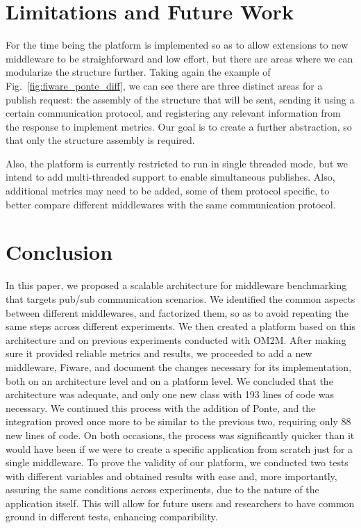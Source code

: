 \documentclass[conference]{IEEEtran}
\begin{document}
\section{Limitations and Future Work}
For the time being the platform is implemented so as to allow extensions to new middleware to be straighforward and low effort, but there are areas where we can modularize the structure further. Taking again the example of Fig.~\ref{fig:fiware_ponte_diff}, we can see there are three distinct areas for a publish request: the assembly of the structure that will be sent, sending it using a certain communication protocol, and registering any relevant information from the response to implement metrics. Our goal is to create a further abstraction, so that only the structure assembly is required. 

Also, the platform is currently restricted to run in single threaded mode, but we intend to add multi-threaded support to enable simultaneous publishes. Also, additional metrics may need to be added, some of them protocol specific, to better compare different middlewares with the same communication protocol. 

\section{Conclusion}

In this paper, we proposed a scalable architecture for middleware benchmarking that targets pub/sub communication scenarios. We identified the common aspects between different middlewares, and factorized them, so as to avoid repeating the same steps across different experiments. We then created a platform based on this architecture and on previous experiments conducted with OM2M. After making sure it provided reliable metrics and results, we proceeded to add a new middleware, Fiware, and document the changes necessary for its implementation, both on an architecture level and on a platform level. We concluded that the architecture was adequate, and only one new class with 193 lines of code was necessary. We continued this process with the addition of Ponte, and the integration proved once more to be similar to the previous two, requiring only 88 new lines of code. On both occasions, the process was significantly quicker than it would have been if we were to create a specific application from scratch just for a single middleware. To prove the validity of our platform, we conducted two tests with different variables and obtained results with ease and, more importantly, assuring the same conditions across experiments, due to the nature of the application itself. This will allow for future users and researchers to have common ground in different tests, enhancing comparibility.
\end{document}
